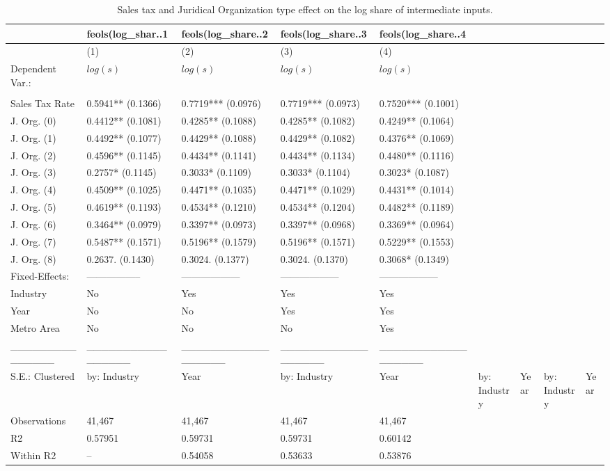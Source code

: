 \documentclass[
  12pt]{article}
\begin{document}
\hypertarget{tbl-reg-tax-jo}{}
\begin{table}
\caption{\label{tbl-reg-tax-jo}Sales tax and Juridical Organization type effect on the log share of
intermediate inputs. }\tabularnewline

\centering
\begin{tabular}[t]{l|l|l|l|l}
\hline
 & feols(log_shar..1 & feols(log_share..2 & feols(log_share..3 & feols(log_share..4\\
\hline
 & (1) & (2) & (3) & (4)\\
\hline
Dependent Var.: & \(log(s)\) & \(log(s)\) & \(log(s)\) & \(log(s)\)\\
\hline
 &  &  &  & \\
\hline
Sales Tax Rate & 0.5941** (0.1366) & 0.7719*** (0.0976) & 0.7719*** (0.0973) & 0.7520*** (0.1001)\\
\hline
J. Org. (0) & 0.4412** (0.1081) & 0.4285** (0.1088) & 0.4285** (0.1082) & 0.4249** (0.1064)\\
\hline
J. Org. (1) & 0.4492** (0.1077) & 0.4429** (0.1088) & 0.4429** (0.1082) & 0.4376** (0.1069)\\
\hline
J. Org. (2) & 0.4596** (0.1145) & 0.4434** (0.1141) & 0.4434** (0.1134) & 0.4480** (0.1116)\\
\hline
J. Org. (3) & 0.2757* (0.1145) & 0.3033* (0.1109) & 0.3033* (0.1104) & 0.3023* (0.1087)\\
\hline
J. Org. (4) & 0.4509** (0.1025) & 0.4471** (0.1035) & 0.4471** (0.1029) & 0.4431** (0.1014)\\
\hline
J. Org. (5) & 0.4619** (0.1193) & 0.4534** (0.1210) & 0.4534** (0.1204) & 0.4482** (0.1189)\\
\hline
J. Org. (6) & 0.3464** (0.0979) & 0.3397** (0.0973) & 0.3397** (0.0968) & 0.3369** (0.0964)\\
\hline
J. Org. (7) & 0.5487** (0.1571) & 0.5196** (0.1579) & 0.5196** (0.1571) & 0.5229** (0.1553)\\
\hline
J. Org. (8) & 0.2637. (0.1430) & 0.3024. (0.1377) & 0.3024. (0.1370) & 0.3068* (0.1349)\\
\hline
Fixed-Effects: & ----------------- & ------------------ & ------------------ & ------------------\\
\hline
Industry & No & Yes & Yes & Yes\\
\hline
Year & No & No & Yes & Yes\\
\hline
Metro Area & No & No & No & Yes\\
\hline
_______________ & _________________ & __________________ & __________________ & __________________\\
\hline
S.E.: Clustered & by: Industry & Year & by: Industry & Year & by: Industry & Year & by: Industry & Year\\
\hline
Observations & 41,467 & 41,467 & 41,467 & 41,467\\
\hline
R2 & 0.57951 & 0.59731 & 0.59731 & 0.60142\\
\hline
Within R2 & -- & 0.54058 & 0.53633 & 0.53876\\
\hline
\end{tabular}
\end{table}
\end{document}
